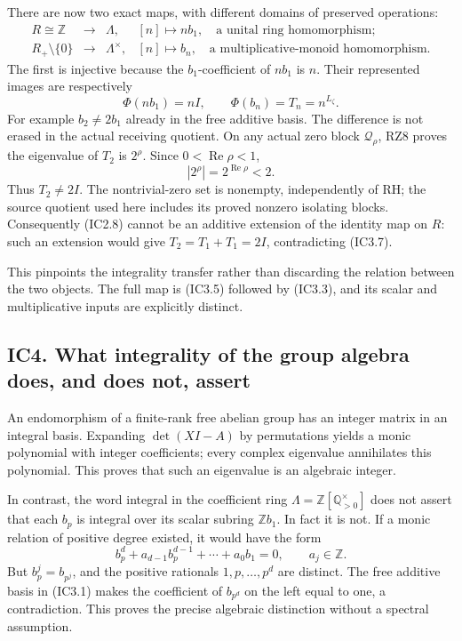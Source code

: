 \documentclass[
]{article}
\newcounter{none} %
\begin{document}
There are now two exact maps, with different domains of preserved
operations: \[
\begin{array}{rcll}
R\cong\mathbb Z&\longrightarrow&\Lambda,&[n]\longmapsto n b_1,
\quad\text{a unital ring homomorphism};\\
R_+\setminus\{0\}&\longrightarrow&\Lambda^\times,&[n]\longmapsto b_n,
\quad\text{a multiplicative-monoid homomorphism}.
\end{array}
\tag{IC3.5}
\] The first is injective because the \(b_1\)-coefficient of \(n b_1\)
is \(n\). Their represented images are respectively \[
\Phi(n b_1)=nI,
\qquad \Phi(b_n)=T_n=n^{L_\zeta}.
\tag{IC3.6}
\] For example \(b_2\ne2b_1\) already in the free additive basis. The
difference is not erased in the actual receiving quotient. On any actual
zero block \(\mathcal Q_\rho\), RZ8 proves the eigenvalue of \(T_2\) is
\(2^\rho\). Since \(0<\operatorname{Re}\rho<1\), \[
|2^\rho|=2^{\operatorname{Re}\rho}<2.
\tag{IC3.7}
\] Thus \(T_2\ne2I\). The nontrivial-zero set is nonempty, independently
of RH; the source quotient used here includes its proved nonzero
isolating blocks. Consequently (IC2.8) cannot be an additive extension
of the identity map on \(R\): such an extension would give
\(T_2=T_1+T_1=2I\), contradicting (IC3.7).

This pinpoints the integrality transfer rather than discarding the
relation between the two objects. The full map is (IC3.5) followed by
(IC3.3), and its scalar and multiplicative inputs are explicitly
distinct.

\subsection{IC4. What integrality of the group algebra does, and does
not,
assert}\label{ic4.-what-integrality-of-the-group-algebra-does-and-does-not-assert}

An endomorphism of a finite-rank free abelian group has an integer
matrix in an integral basis. Expanding \(\det(XI-A)\) by permutations
yields a monic polynomial with integer coefficients; every complex
eigenvalue annihilates this polynomial. This proves that such an
eigenvalue is an algebraic integer.

In contrast, the word integral in the coefficient ring
\(\Lambda=\mathbb Z[\mathbb Q_{>0}^{\times}]\) does not assert that each
\(b_p\) is integral over its scalar subring \(\mathbb Zb_1\). In fact it
is not. If a monic relation of positive degree existed, it would have
the form \[
b_p^d+a_{d-1}b_p^{d-1}+\cdots+a_0b_1=0,
\qquad a_j\in\mathbb Z.
\tag{IC4.1}
\] But \(b_p^j=b_{p^j}\), and the positive rationals \(1,p,\ldots,p^d\)
are distinct. The free additive basis in (IC3.1) makes the coefficient
of \(b_{p^d}\) on the left equal to one, a contradiction. This proves
the precise algebraic distinction without a spectral assumption.
\end{document}
